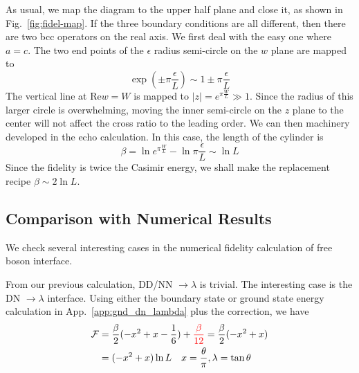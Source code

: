 \documentclass{article}
\begin{document}


As usual, we map the diagram to the upper half plane and close it, as shown in Fig.~\ref{fig:fidel-map}. If the three boundary conditions are all different, then there are two bcc operators on the real axis. We first deal with the easy one where $a = c$. The two end points of the $\epsilon$ radius semi-circle on the $w$ plane are mapped to
\begin{equation}
\exp( \pm \pi \frac{\epsilon}{ L}  ) \sim 1 \pm \pi \frac{\epsilon}{L} 
\end{equation}
The vertical line at $\text{Re} w = W$ is mapped to $|z| = e^{\pi \frac{W}{L} } \gg 1 $. Since the radius of this larger circle is overwhelming, moving the inner semi-circle on the $z$ plane to the center will not affect the cross ratio to the leading order. We can then machinery developed in the echo calculation. In this case, the length of the cylinder is
\begin{equation}
\beta = \ln e^{\pi \frac{W}{L}} - \ln \pi \frac{\epsilon}{L}  \sim \ln L 
\end{equation}
Since the fidelity is twice the Casimir energy, we shall make the replacement recipe $\beta \sim 2 \ln L$. 




\subsection{Comparison with Numerical Results}

We check several interesting cases in the numerical fidelity calculation of free boson interface. 

From our previous calculation, DD/NN $\rightarrow \lambda$ is trivial. The interesting case is the DN $\rightarrow \lambda$ interface. Using either the boundary state or ground state energy calculation in App.~\ref{app:gnd_dn_lambda} plus the correction, we have
\begin{equation}
\begin{aligned}
\mathcal{F} &= \frac{\beta}{2}( - x^2 + x - \frac{1}{6} ) + {\color{red} \frac{\beta}{12}} = \frac{\beta}{2}( - x^2 + x ) \\
&= ( - x^2 + x ) \ln L  \quad x = \frac{\theta}{\pi}, \lambda = \tan \theta 
\end{aligned}
\end{equation}
\end{document}
